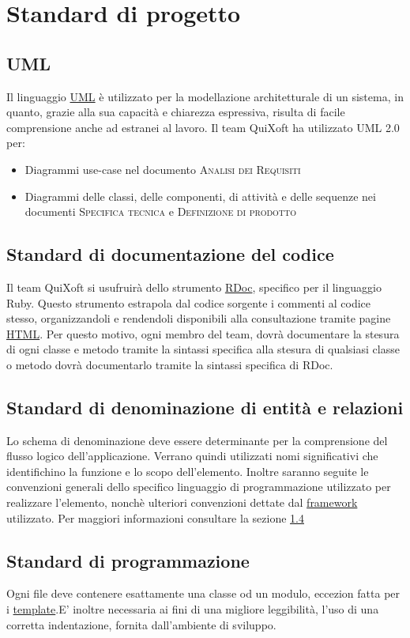 \documentclass[11pt,a4paper]{article}
\begin{document}
\section{Standard di progetto}
\subsection{UML}
Il linguaggio \underline{UML} è utilizzato per la modellazione architetturale di un sistema, in quanto, grazie alla sua capacità e chiarezza espressiva, risulta di facile comprensione anche ad estranei al lavoro. Il team QuiXoft ha utilizzato UML 2.0 per:
\begin{itemize}
 \item Diagrammi use-case nel documento \textsc{Analisi dei Requisiti}
 \item Diagrammi delle classi, delle componenti, di attività e delle sequenze nei documenti \textsc{Specifica tecnica} e \textsc{Definizione di prodotto}
\end{itemize}

\subsection{Standard di documentazione del codice}
Il team QuiXoft si usufruirà dello strumento \underline{RDoc}, specifico per il linguaggio Ruby. Questo strumento estrapola dal codice sorgente i commenti al codice stesso, organizzandoli e rendendoli disponibili alla consultazione tramite pagine \underline{HTML}. Per questo motivo, ogni membro del team, dovrà documentare la stesura di ogni classe e metodo tramite la sintassi specifica alla stesura di qualsiasi classe o metodo dovrà documentarlo tramite la sintassi specifica di RDoc.

\subsection{Standard di denominazione di entità e relazioni}
Lo schema di denominazione deve essere determinante per la comprensione del flusso logico dell'applicazione. Verrano quindi utilizzati nomi significativi che identifichino la funzione e lo scopo dell'elemento. Inoltre saranno seguite le convenzioni generali dello specifico linguaggio di programmazione utilizzato per realizzare l'elemento, nonchè ulteriori convenzioni dettate dal \underline{framework} utilizzato. Per maggiori informazioni consultare la sezione \ref{programmazione}

\subsection{Standard di programmazione}\label{programmazione}
Ogni file deve contenere esattamente una classe od un modulo, eccezion fatta per i \underline{template}.E' inoltre necessaria ai fini di una migliore leggibilità, l'uso di una corretta indentazione, fornita dall'ambiente di sviluppo.
\end{document}
